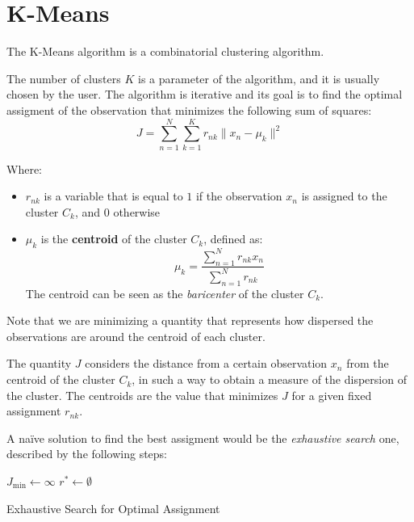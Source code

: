 \section{K-Means}
The K-Means algorithm is a combinatorial clustering algorithm.

The number of clusters $K$ is a parameter of the algorithm, and it is usually chosen by the user. The algorithm is iterative and its goal is to find the optimal assigment of the observation that minimizes the following sum of squares:
\[
    J = \sum_{n=1}^{N} \sum_{k=1}^K r_{nk} \|x_n - \mu_k\|^2
\]

Where:
\begin{itemize}
    \item $r_{nk}$ is a variable that is equal to $1$ if the observation $x_n$ is assigned to the cluster $C_k$, and $0$ otherwise
    \item $\mu_k$ is the \textbf{centroid} of the cluster $C_k$, defined as:
    \[
        \mu_k = \frac{\sum_{n=1}^{N} r_{nk} x_n}{\sum_{n=1}^{N} r_{nk}}
    \]
    The centroid can be seen as the \textit{baricenter} of the cluster $C_k$. 
\end{itemize}

Note that we are minimizing a quantity that represents how dispersed the observations are around the centroid of each cluster.

The quantity $J$ considers the distance from a certain observation $x_n$ from the centroid of the cluster $C_k$, in such a way to obtain a measure of the dispersion of the cluster. The centroids are the value that minimizes $J$ for a given fixed assignment $r_{nk}$.

A naïve solution to find the best assigment would be the \textit{exhaustive search} one, described by the following steps:
\begin{algorithm}
    \SetAlgoLined
    
    
    $J_{\text{min}} \leftarrow \infty$\;
    $r^\ast \leftarrow \emptyset$\;
    
    
    \caption{Exhaustive Search for Optimal Assignment}
\end{algorithm}

